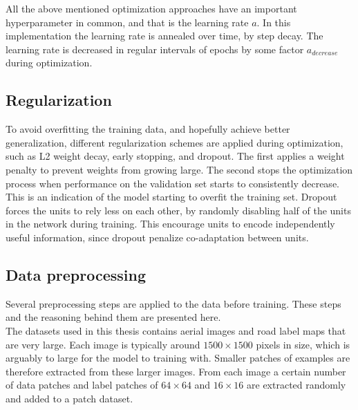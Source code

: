 All the above mentioned optimization approaches have an important hyperparameter in common, and that is the learning rate $a$. In this implementation the learning rate is annealed over time, by step decay. The learning rate is decreased in regular intervals of epochs by some factor $a_{decrease}$ during optimization. \\


\subsection{Regularization}
To avoid overfitting the training data, and hopefully achieve better generalization, different regularization schemes are applied during optimization, such as L2 weight decay, early stopping, and dropout. The first applies a weight penalty to prevent weights from growing large. The second stops the optimization process when performance on the validation set starts to consistently decrease. This is an indication of the model starting to overfit the training set. Dropout forces the units to rely less on each other, by randomly disabling half of the units in the network during training. This encourage units to encode independently useful information, since dropout penalize co-adaptation between units.\\


\subsection{Data preprocessing}
Several preprocessing steps are applied to the data before training. These steps and the reasoning behind them are presented here. \\

The datasets used in this thesis contains aerial images and road label maps that are very large. Each image is typically around $1500 \times 1500$ pixels in size, which is arguably to large for the model to training with. Smaller patches of examples are therefore extracted from these larger images. From each image a certain number of data patches and label patches of $64 \times 64$ and $16 \times 16$ are extracted randomly and added to a patch dataset.\\

